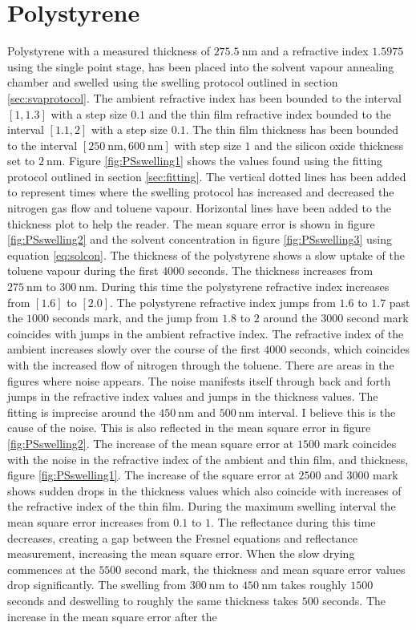 \documentclass[MasterThesisMain.tex]{subfiles}
\begin{document}
\section{Polystyrene}
Polystyrene with a measured thickness of $\SI{275.5}{\nano\meter}$ and a refractive index $1.5975$ using the single point stage, has been placed into the solvent vapour annealing chamber and swelled using the swelling protocol outlined in section \ref{sec:svaprotocol}. The ambient refractive index has been bounded to the interval $[1,1.3]$ with a step size $0.1$ and the thin film refractive index bounded to the interval $[1.1,2]$ with a step size $0.1$. The thin film thickness has been bounded to the interval $[\SI{250}{\nano\meter},\SI{600}{\nano\meter}]$ with step size $1$ and the silicon oxide thickness set to $\SI{2}{\nano\meter}$. Figure \ref{fig:PSswelling1} shows the values found using the fitting protocol outlined in section \ref{sec:fitting}. The vertical dotted lines has been added to represent times where the swelling protocol has increased and decreased the nitrogen gas flow and toluene vapour. Horizontal lines have been added to the thickness plot to help the reader. The mean square error is shown in figure \ref{fig:PSswelling2} and the solvent concentration in figure \ref{fig:PSswelling3} using equation \ref{eq:solcon}. The thickness of the polystyrene shows a slow uptake of the toluene vapour during the first $4000$ seconds. The thickness increases from $\SI{275}{\nano\meter}$ to $\SI{300}{\nano\meter}$. During this time the polystyrene refractive index increases from $[1.6]$ to $[2.0]$. The polystyrene refractive index jumps from $1.6$ to $1.7$ past the $1000$ seconds mark, and the jump from $1.8$ to $2$ around the $3000$ second mark coincides with jumps in the ambient refractive index. The refractive index of the ambient increases slowly over the course of the first $4000$ seconds, which coincides with the increased flow of nitrogen through the toluene. There are areas in the figures where noise appears. The noise manifests itself through back and forth jumps in the refractive index values and jumps in the thickness values. The fitting is imprecise around the $\SI{450}{\nano\meter}$ and $\SI{500}{\nano\meter}$ interval. I believe this is the cause of the noise. This is also reflected in the mean square error in figure \ref{fig:PSswelling2}. The increase of the mean square error at $1500$ mark coincides with the noise in the refractive index of the ambient and thin film, and thickness, figure \ref{fig:PSswelling1}. The increase of the square error at $2500$ and $3000$ mark shows sudden drops in the thickness values which also coincide with increases of the refractive index of the thin film. During the maximum swelling interval the mean square error increases from $0.1$ to $1$. The reflectance during this time decreases, creating a gap between the Fresnel equations and reflectance measurement, increasing the mean square error. When the slow drying commences at the $5500$ second mark, the thickness and mean square error values drop significantly. The swelling from $\SI{300}{\nano\meter}$ to $\SI{450}{\nano\meter}$ takes roughly $1500$ seconds and deswelling to roughly the same thickness takes $500$ seconds. The increase in the mean square error after the 
\end{document}
